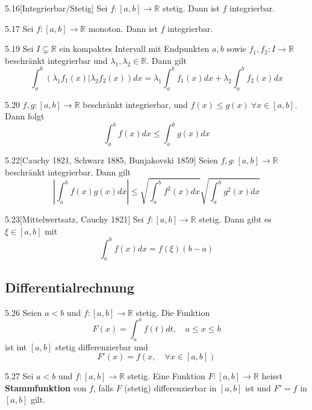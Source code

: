 \documentclass[8pt,a4paper,twocolumn,table]{extarticle}
\newcommand{\R}{\mathbb{R}}
\begin{document}
\begin{satz}{5.16}[Integrierbar/Stetig]
    Sei $f: [a,b] \to \R$ stetig. Dann ist $f$ integrierbar.
\end{satz}

\begin{satz}{5.17}
    Sei $f: [a,b] \to \R$ monoton. Dann ist $f$ integrierbar.
\end{satz}

\begin{satz}{5.19}
    Sei $I \subsetneq \R$ ein kompaktes Intervall mit Endpunkten $a, b$ sowie $f_1, f_2: I \to \R$ beschränkt integrierbar
    und $\lambda_1,\lambda_2 \in \R$. Dann gilt
    \[ \int_a^b (\lambda_1 f_1(x) | \lambda_2 f_2(x)) dx = \lambda_1 \int_a^b f_1(x)dx + \lambda_2 \int_a^b f_2(x) dx \]
\end{satz}

\begin{satz}{5.20}
    $f, g: [a,b] \to \R$ beschränkt integrierbar, und $f(x) \le g(x)\ \forall x \in [a, b]$.
    Dann folgt
    \[ \int_a^b f(x)dx \le \int_a^b g(x)dx \]
\end{satz}

\begin{satz}{5.22}[Cauchy 1821, Schwarz 1885, Bunjakovski 1859]
    Seien $f,g: [a,b] \to \R$ beschränkt integrierbar. Dann gilt
    \[ \left| \int_a^b f(x)g(x) dx \right| \le \sqrt{\int_a^b f^2(x)dx} \sqrt{\int_a^b g^2(x)dx} \]
\end{satz}

\begin{satz}{5.23}[Mittelwertsatz, Cauchy 1821]
    Sei $f: [a,b] \to \R$ stetig. Dann gibt es $\xi \in [a,b]$ mit
    \[ \int_a^b f(x) dx = f(\xi)(b-a) \]
\end{satz}

\subsection{Differentialrechnung}

\begin{satz}{5.26}
    Seien $a < b$ und $f: [a, b] \to \R$ stetig. Die Funktion
    \[ F(x) = \int_a^x f(t) dt,\quad a \le x \le b \]
    ist int $[a, b]$ stetig differenzierbar und
    \[ F'(x) = f(x, \quad \forall x \in [a, b]) \]
\end{satz}

\begin{definition}{5.27}
    Sei $a < b$ und $f: [a,b] \to \R$ stetig. Eine Funktion $F: [a,b ] \to \R$ heisst \textbf{Stammfunktion} von $f$, falls $F$
    (stetig) differenzierbar in $[a, b]$ ist und $F' = f$ in $[a, b]$ gilt.
\end{definition}
\end{document}
